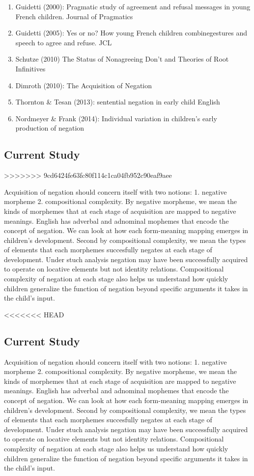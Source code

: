 \documentclass[man,floatsintext,draftall]{apa6}
\begin{document}
\begin{enumerate}
\item
  Guidetti (2000): Pragmatic study of agreement and refusal messages in young French children. Journal of Pragmatics
\item
  Guidetti (2005): Yes or no? How young French children combinegestures and speech to agree and refuse. JCL
\item
  Schutze (2010) The Status of Nonagreeing Don't and Theories of Root Infinitives
\item
  Dimroth (2010): The Acquisition of Negation
\item
  Thornton \& Tesan (2013): sentential negation in early child English
\item
  Nordmeyer \& Frank (2014): Individual variation in children's early production of negation
\end{enumerate}

\hypertarget{current-study}{%
\subsection{Current Study}\label{current-study}}
>>>>>>> 9cd6424fe63fc80f114c1ca04fb952c90eaf9aee

Acquisition of negation should concern itself with two notions: 1. negative morpheme 2. compositional complexity. By negative morpheme, we mean the kinds of morphemes that at each stage of acquisition are mapped to negative meanings. English has adverbal and adnominal mophemes that encode the concept of negation. We can look at how each form-meaning mapping emerges in children's development. Second by compositional complexity, we mean the types of elements that each morphemes succesfully negates at each stage of development. Under stuch analysis negation may have been successfully acquired to operate on locative elements but not identity relations. Compositional complexity of negation at each stage also helps us understand how quickly children generalize the function of negation beyond specific arguments it takes in the child's input.

<<<<<<< HEAD
\subsection{Current Study}\label{current-study}

Acquisition of negation should concern itself with two notions: 1.
negative morpheme 2. compositional complexity. By negative morpheme, we
mean the kinds of morphemes that at each stage of acquisition are mapped
to negative meanings. English has adverbal and adnominal mophemes that
encode the concept of negation. We can look at how each form-meaning
mapping emerges in children's development. Second by compositional
complexity, we mean the types of elements that each morphemes
succesfully negates at each stage of development. Under stuch analysis
negation may have been successfully acquired to operate on locative
elements but not identity relations. Compositional complexity of
negation at each stage also helps us understand how quickly children
generalize the function of negation beyond specific arguments it takes
in the child's input.
\end{document}
